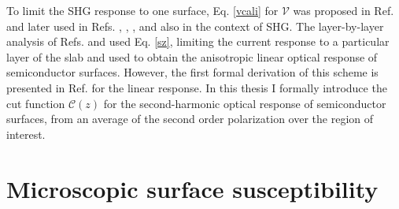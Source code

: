 To limit the SHG response to one surface, Eq. \eqref{vcali} for
$\boldsymbol{\mathcal{V}}$ was proposed in Ref. \cite{reiningPRB94} and later
used in Refs. \cite{mendozaPRL98}, \cite{mendozaPRB01}, \cite{sanoPRB02}, and
\cite{mejiaRMF04} also in the context of SHG. The layer-by-layer analysis of
Refs. \cite{hoganPRB03} and \cite{castilloPRB03} used Eq. \eqref{sz}, limiting
the current response to a particular layer of the slab and used to obtain the
anisotropic linear optical response of semiconductor surfaces. However, the
first formal derivation of this scheme is presented in Ref. \cite{mendozaPRB06}
for the linear response. In this thesis I formally introduce the cut function
$\boldsymbol{\mathcal{C}}(z)$ for the second-harmonic optical response of
semiconductor surfaces, from an average of the second order polarization over
the region of interest.



\section{Microscopic surface susceptibility}

